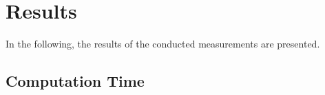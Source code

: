 

\section{Results}
In the following, the results of the conducted measurements are presented. 

\subsection{Computation Time}

